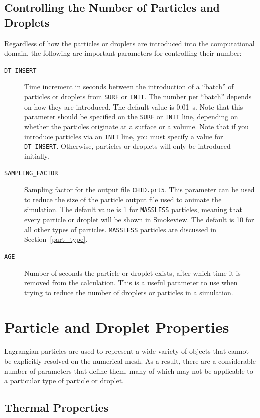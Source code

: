 \documentclass[11pt]{book}
\newcommand{\ct}{\tt\small}
\begin{document}
\subsection{Controlling the Number of Particles and Droplets}
\label{info:particle_number}

Regardless of how the particles or droplets are introduced into the computational domain, the following are important
parameters for controlling their number:
\begin{description}
\item[{\ct DT\_INSERT}] Time increment in seconds between the introduction of a ``batch'' of particles or droplets from {\ct SURF}
or {\ct INIT}. The number per ``batch'' depends on how they are introduced. The default value is 0.01~s. Note that this
parameter should be specified on the {\ct SURF} or {\ct INIT} line, depending on whether the particles
originate at a surface or a volume. Note that if you introduce particles via an {\ct INIT} line,
you must specify a value for {\ct DT\_INSERT}. Otherwise, particles or droplets will only be introduced initially.
\item[{\ct SAMPLING\_FACTOR}]     Sampling factor for the output
file {\ct CHID.prt5}. This parameter can be used to reduce the size
of the particle output file used to animate the simulation. The default value is 1 for {\ct MASSLESS} particles, meaning that every particle or droplet will be shown in Smokeview.
The default is 10 for all other types of particles. {\ct MASSLESS} particles are discussed in Section~\ref{part_type}.
\item[{\ct AGE}]  Number of seconds the particle or droplet exists, after which time it is removed from the calculation. This is a useful parameter to use when
trying to reduce the number of droplets or particles in a simulation.
\end{description}


\clearpage

\section{Particle and Droplet Properties}

Lagrangian particles are used to represent a wide variety of objects that cannot be explicitly resolved on the numerical
mesh. As a result, there are a considerable number of parameters that define them, many of which may not be applicable to
a particular type of particle or droplet.


\subsection{Thermal Properties}
\end{document}
